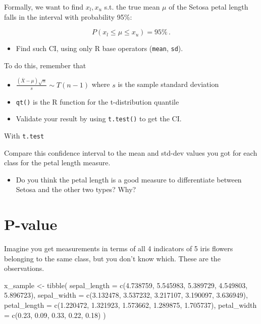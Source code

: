 \documentclass[
  oneside]{book}
\newenvironment{Shaded}{\begin{snugshade}}{\end{snugshade}}
\newcommand{\AttributeTok}[1]{\textcolor[rgb]{0.77,0.63,0.00}{#1}}
\newcommand{\FloatTok}[1]{\textcolor[rgb]{0.00,0.00,0.81}{#1}}
\newcommand{\FunctionTok}[1]{\textcolor[rgb]{0.00,0.00,0.00}{#1}}
\newcommand{\NormalTok}[1]{#1}
\newcommand{\OtherTok}[1]{\textcolor[rgb]{0.56,0.35,0.01}{#1}}
\providecommand{\tightlist}{%
  \setlength{\itemsep}{0pt}\setlength{\parskip}{0pt}}
\begin{document}
Formally, we want to find \(x_l, x_u\) s.t. the true mean \(\mu\)
of the Setosa petal length falls in the interval with probability 95\%:

\[
P(x_l \leq \mu \leq x_u) = 95\%\,.
\]

\begin{itemize}
\tightlist
\item
  Find such CI, using only R base operators (\texttt{mean}, \texttt{sd}).
\end{itemize}

To do this, remember that

\begin{itemize}
\item
  \(\frac{(\bar{X} - \mu)\sqrt{n}}{s} \sim T(n-1)\) where \(s\) is the sample standard deviation
\item
  \texttt{qt()} is the R function for the t-distribution quantile
\item
  Validate your result by using \texttt{t.test()} to get the CI.
\end{itemize}

With \texttt{t.test}

Compare this confidence interval to the mean and std-dev
values you got for each class for the petal length measure.

\begin{itemize}
\tightlist
\item
  Do you think the petal length is a good measure to
  differentiate between Setosa and the other two types? Why?
\end{itemize}

\hypertarget{p-value-1}{%
\section{P-value}\label{p-value-1}}

Imagine you get measurements in terms of all 4 indicators of
5 iris flowers belonging to the same class, but you don't know
which. These are the observations.

\begin{Shaded}
\begin{Highlighting}[]
\NormalTok{x\_sample }\OtherTok{\textless{}{-}} \FunctionTok{tibble}\NormalTok{(}
  \AttributeTok{sepal\_length =} \FunctionTok{c}\NormalTok{(}\FloatTok{4.738759}\NormalTok{, }\FloatTok{5.545983}\NormalTok{, }\FloatTok{5.389729}\NormalTok{, }\FloatTok{4.549803}\NormalTok{, }\FloatTok{5.896723}\NormalTok{),}
  \AttributeTok{sepal\_width =} \FunctionTok{c}\NormalTok{(}\FloatTok{3.132478}\NormalTok{, }\FloatTok{3.537232}\NormalTok{, }\FloatTok{3.217107}\NormalTok{, }\FloatTok{3.190097}\NormalTok{, }\FloatTok{3.636949}\NormalTok{),}
  \AttributeTok{petal\_length =} \FunctionTok{c}\NormalTok{(}\FloatTok{1.220472}\NormalTok{, }\FloatTok{1.321923}\NormalTok{, }\FloatTok{1.573662}\NormalTok{, }\FloatTok{1.289875}\NormalTok{, }\FloatTok{1.705737}\NormalTok{),}
  \AttributeTok{petal\_width =} \FunctionTok{c}\NormalTok{(}\FloatTok{0.23}\NormalTok{, }\FloatTok{0.09}\NormalTok{, }\FloatTok{0.33}\NormalTok{, }\FloatTok{0.22}\NormalTok{, }\FloatTok{0.18}\NormalTok{)}
\NormalTok{)}
\end{Highlighting}
\end{Shaded}
\end{document}
